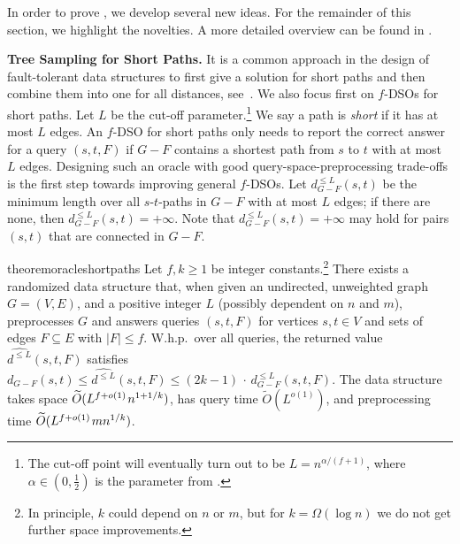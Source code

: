 \documentclass{theoretics}
\newcommand{\RestateRemark}[1]{{\normalfont\bfseries #1}}
\newcommand{\RestateInit}[1]{\newcommand{#1}{}}
\newcommand*{\Otilde}{\widetilde{O}}
\newcommand*{\nwspace}{\hspace*{.1em}}
\renewcommand{\le}{\leqslant}
\renewcommand{\ge}{\geqslant}
\begin{document}
In order to prove , we develop several new ideas.
For the remainder of this section, we highlight the novelties.
A more detailed overview
can be found in .
\vspace*{.5em}

\noindent
\textbf{Tree Sampling for Short Paths.}
It is a common approach in the design of fault-tolerant data structures
to first give a solution for short paths and then combine them into one for all distances,
see~\cite{ChCo20, KarthikParter21DeterministicRPC, GrandoniVWilliamsFasterRPandDSO_journal, GuRen21, Ren22Improved, WY13}.
We also focus first on $f$-DSOs for short paths.
Let $L$ be the cut-off parameter.\footnote{%
	The cut-off point will eventually turn out to be $L = n^{\alpha/(f+1)}$,
	where $\alpha \in (0,\frac{1}{2})$ is the parameter from .
} 
We say a path is \emph{short} if it has at most $L$ edges.
An $f$-DSO for short paths only needs to report the correct answer for a query $(s,t,F)$
if $G-F$ contains a shortest path from $s$ to $t$ with at most $L$ edges. 
%	
	Designing such an oracle with good query-space-preprocessing trade-offs 
	is the first step towards improving general $f$-DSOs. 
    Let $d_{G-F}^{\le L}(s,t)$ be the minimum length over all $s$-$t$-paths in $G-F$ with at most $L$ edges; if there are none, then $d_{G-F}^{\le L}(s,t) = +\infty$.
    Note that $d_{G-F}^{\le L}(s,t) = +\infty$ may hold for pairs $(s,t)$
    that are connected in $G-F$.
\begin{restatable}{theorem}{oracleshortpaths}
\label{thm:oracle_short_paths}%
  Let $f, k \ge 1$ be integer constants.\footnote{%
  In principle, $k$ could depend on $n$ or $m$,
  but for $k = \Omega(\log n)$ we do not get further space improvements.
}
  There exists a randomized data structure that,
  when given an undirected, unweighted graph $G = (V,E)$, 
  and a positive integer $L$ (possibly dependent on $n$ and $m$),
  preprocesses $G$ and answers queries $(s,t,F)$ 
  for vertices $s,t \in V$ and sets of edges $F \subseteq E$ with $|F| \le f$.
  W.h.p.\ over all queries,
  the returned value $\widehat{d^{\le L}}(s,t,F)$ satisfies 
  $d_{G-F}(s,t) \le \widehat{d^{\le L}}(s,t,F) \le (2k{-}1) \,{\cdot}\,d_{G-F}^{\le L}(s,t,F)$.
  The data structure takes space $\Otilde(L^{f+o(1)} \nwspace n^{1+1/k})$, 
  has query time $\Otilde(L^{o(1)})$, 
    and preprocessing time $\Otilde(L^{f+o(1)} \nwspace mn^{1/k})$.
\end{restatable}
\end{document}
